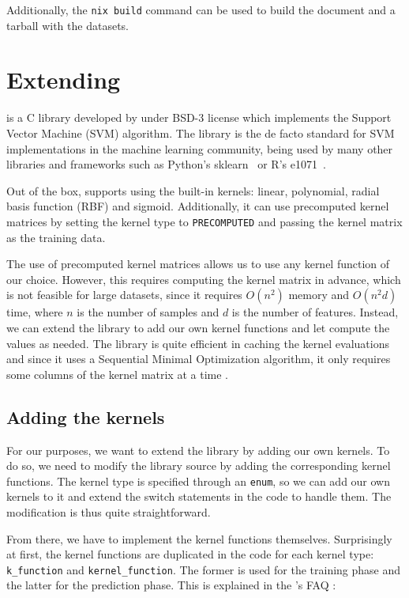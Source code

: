 Additionally, the \texttt{nix build} command can be used to build the
document and a tarball with the datasets.

\section{Extending \libsvm{}}%
\label{sub:impl_c}

\libsvm is a C library developed by \textcite{CC01a} under BSD-3 license
which implements the Support Vector Machine (SVM) algorithm. The library is the
de facto standard for SVM implementations in the machine learning community,
being used by many other libraries and frameworks such as Python's
sklearn~\cite{ScikitlearnScikitlearn2023} or R's
e1071~\cite{meyer[autE1071MiscFunctions2023}.

Out of the box, \libsvm supports using the built-in kernels: linear,
polynomial, radial basis function (RBF) and sigmoid. Additionally, it can use
precomputed kernel matrices by setting the kernel type to \texttt{PRECOMPUTED}
and passing the kernel matrix as the training data.

The use of precomputed kernel matrices allows us to use any kernel function
of our choice. However, this requires computing the kernel matrix in advance,
which is not feasible for large datasets, since it requires $O(n^2)$ memory and
$O(n^2d)$ time, where $n$ is the number of samples and $d$ is the number of
features.
Instead, we can extend the library to add our own kernel functions
and let \libsvm compute the values as needed.
The \libsvm library is quite efficient in caching the kernel evaluations
and since it uses a Sequential Minimal Optimization algorithm, it only requires
some columns of the kernel matrix at a time \cite{CC01a}.

\subsection{Adding the kernels}

For our purposes, we want to extend the library by adding our own kernels. To do
so, we need to modify the library source by adding the corresponding kernel
functions. The kernel type is specified through an \texttt{enum}, so we can add
our own kernels to it and extend the switch statements in the code to handle
them. The modification is thus quite straightforward.
\cite{arquemartinezDissenyImplementacioEstudi2021}

From there, we have to implement the kernel functions themselves. Surprisingly
at first, the kernel functions are duplicated in the code for each kernel type:
\texttt{k\_function} and \texttt{kernel\_function}. The former is used for the
training phase and the latter for the prediction phase. This is explained in the
\libsvm{}'s FAQ \cite{LIBSVMFAQ}:


